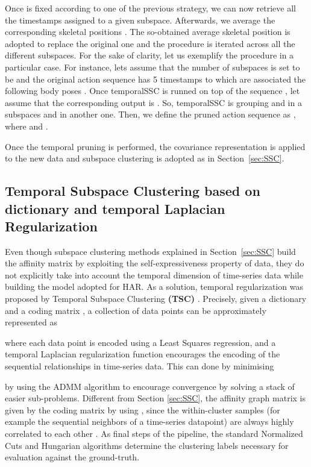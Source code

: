 \documentclass[10pt,a4paper,conference]{IEEEtran}
\begin{document}
Once  is fixed according to one of the previous strategy, we can now retrieve all the timestamps  assigned to a given subspace. Afterwards, we average the corresponding skeletal positions . The so-obtained average skeletal position is adopted to replace the original one and the procedure is iterated across all the different subspaces. For the sake of clarity, let us exemplify the procedure in a particular case. For instance, lets assume that the number of subspaces is set to be  and the original action sequence has 5 timestamps to which are associated the following body poses . Once temporalSSC is runned on top of the sequence , let assume that the corresponding output is . So, temporalSSC is grouping  and  in a subspaces and  in another one. Then, we  define the pruned action sequence as , where  and .



Once the temporal pruning is performed, the covariance representation is applied to the new data and subspace clustering is adopted as in Section~\ref{sec:SSC}.


\subsection{Temporal Subspace Clustering based on dictionary and temporal Laplacian Regularization}\label{sec:TSC}

Even though subspace clustering methods explained in Section~\ref{sec:SSC} build the affinity matrix  by exploiting the self-expressiveness property of data, they do not explicitly take into account the temporal dimension of time-series data while building the model adopted for HAR.
As a solution, temporal regularization was proposed by Temporal Subspace Clustering \textbf{(TSC)} \cite{li2015temporal}. Precisely, given a dictionary  and a coding matrix , a collection of data points  can be approximately represented as

where each data point is encoded using a Least Squares regression, and a temporal Laplacian regularization  function encourages the encoding of the sequential relationships in time-series data. This can done by minimising

by using the ADMM algorithm to encourage convergence by solving a stack of easier sub-problems. Different from Section \ref{sec:SSC}, the affinity graph matrix  is given by the coding matrix  by using , since the within-cluster samples (for example the sequential neighbors of a time-series datapoint) are always highly correlated to each other \cite{li2013low, li2014learning}. As final steps of the pipeline, the standard Normalized Cuts \cite{shi2000normalized} and Hungarian algorithms determine the clustering labels necessary for evaluation against the ground-truth.
\end{document}

